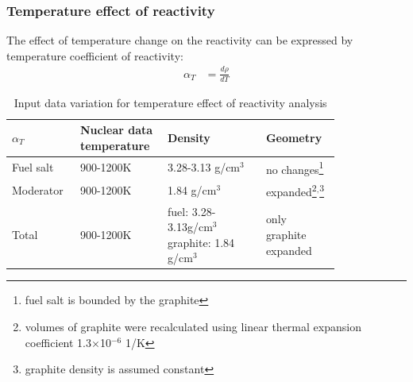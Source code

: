 \begin{frame}
  \frametitle{Temperature effect of reactivity}

  The effect of temperature change on the reactivity can be expressed by temperature coefficient of reactivity:
  \begin{align}
    \alpha_T &= \frac{d\rho}{dT}
  \end{align}
  \vspace{-0.2in}
  \captionsetup[table]{
  labelsep = newline,
  name = TABLE, justification=justified,
  singlelinecheck=false,%
  labelsep=colon,%
  skip = \medskipamount}

  \begin{table}[h!]
    \caption{Input data variation for temperature effect of reactivity analysis}
      \vspace{-0.1in}
  \begin{tabular}{p{0.16\linewidth} p{0.19\linewidth} p{0.27\linewidth} 
        p{0.20\linewidth}} \toprule
        $\alpha_T$ & \textbf{Nuclear data temperature} &  \textbf{Density}    & \textbf{Geometry}             \\ \midrule       
        Fuel salt        & 900-1200K & 3.28-3.13 g/cm$^3$\cite{robertson_conceptual_1971} &
        no changes\footnote{fuel salt is bounded by the graphite} \\ \midrule
        Moderator        & 900-1200K & 1.84 g/cm$^3$\cite{robertson_conceptual_1971} &
        expanded\footnote{volumes of graphite were recalculated using linear thermal expansion coefficient
           1.3$\times$10$^{-6}$ 1/K}$^{,}$\footnote{graphite density is assumed constant} \\ \midrule
        Total            & 900-1200K & fuel: 3.28-3.13g/cm$^3$ graphite: 1.84 g/cm$^3$  & only graphite expanded \\
\bottomrule
\end{tabular}
  \label{tab:tmethod}
\end{table}  
  
\end{frame}

